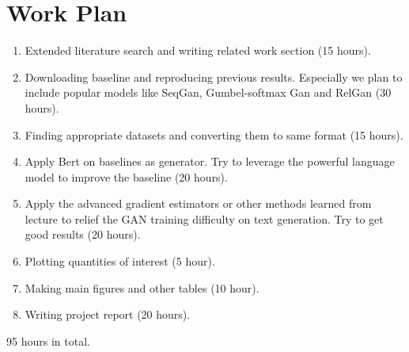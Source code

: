 \documentclass[12pt]{report}
\begin{document}
\section*{Work Plan}
\begin{enumerate}
    \item Extended literature search and writing related work section (15 hours).
    \item Downloading baseline and reproducing previous results. Especially we plan to include popular models like SeqGan\cite{yu2017seqgan},  Gumbel-softmax Gan\cite{kusner2016gans} and RelGan \cite{nie2018relgan}(30 hours). 
    \item Finding appropriate datasets and converting them to same format (15 hours).
    \item Apply Bert\cite{devlin2018bert} on baselines as generator. Try to leverage the powerful language model to improve the baseline (20 hours).
    \item Apply the advanced gradient estimators or other methods learned from lecture to relief the GAN training difficulty on text generation. Try to get good results (20 hours).
    \item Plotting quantities of interest (5 hour).
    \item Making main figures and other tables (10 hour).
    \item Writing project report (20 hours).

\end{enumerate}
95 hours in total.
\end{document}
